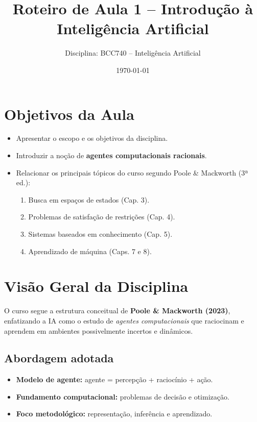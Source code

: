 \documentclass[9pt,a4paper]{extarticle}
\begin{document}
\title{Roteiro de Aula 1 -- Introdução à Inteligência Artificial}
\author{Disciplina: BCC740 -- Inteligência Artificial}
\date{\today}
\maketitle

\section{Objetivos da Aula}
\begin{itemize}
  \item Apresentar o escopo e os objetivos da disciplina.
  \item Introduzir a noção de \textbf{agentes computacionais racionais}.
  \item Relacionar os principais tópicos do curso segundo Poole \& Mackworth (3ª ed.):
  \begin{enumerate}
    \item Busca em espaços de estados (Cap. 3).
    \item Problemas de satisfação de restrições (Cap. 4).
    \item Sistemas baseados em conhecimento (Cap. 5).
    \item Aprendizado de máquina (Caps. 7 e 8).
  \end{enumerate}
\end{itemize}

\section{Visão Geral da Disciplina}

O curso segue a estrutura conceitual de \textbf{Poole \& Mackworth (2023)}, enfatizando a IA como o estudo de \textit{agentes computacionais} que raciocinam e aprendem em ambientes possivelmente incertos e dinâmicos.

\subsection*{Abordagem adotada}
\begin{itemize}
  \item \textbf{Modelo de agente:} agente = percepção + raciocínio + ação.
  \item \textbf{Fundamento computacional:} problemas de decisão e otimização.
  \item \textbf{Foco metodológico:} representação, inferência e aprendizado.
\end{itemize}
\end{document}
